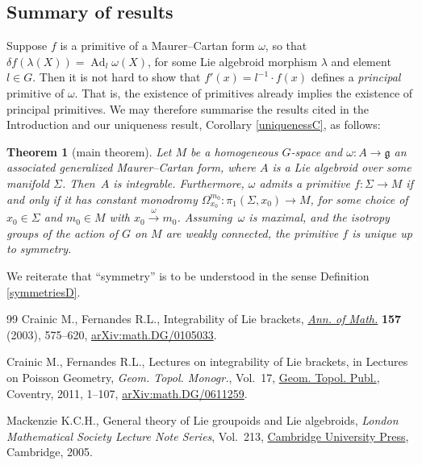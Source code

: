 \documentclass[11pt]{article}
\numberwithin{equation}{section}
\numberwithin{equation}{section}
\newtheorem{Theorem}{Theorem}[section]
\DeclareMathOperator{\Adjoint}{Ad}
\begin{document}
\subsection*{Summary of results}

Suppose $f$ is a primitive of a Maurer--Cartan form $\omega $, so that
$\delta f (\lambda(X))=\Adjoint_l \omega(X)$, for some Lie algebroid
morphism $\lambda $ and element $l \in G$. Then it is not hard to show
that $f'(x)=l^{-1} \cdot f(x)$ defines a {\em principal} primitive of
$\omega $. That is, the existence of primitives already implies the
existence of principal primitives. We may therefore summarise the
results cited in the Introduction and our uniqueness result, Corollary
\ref{uniquenessC}, as follows:

\begin{Theorem}[main theorem]\label{summaryT}
 Let $M$ be a homogeneous $G$-space and
 $\omega \colon A \rightarrow {\mathfrak g} $ an associated
 generalized Maurer--Cartan form, where $A$ is a Lie algebroid over
 some manifold $\Sigma $. Then~$A$ is integrable. Furthermore,
 $\omega $ admits a primitive $f \colon \Sigma \rightarrow M$ if and
 only if it has constant monodromy
 $\Omega_{x_0}^{m_0} \colon \pi_1(\Sigma, x_0) \rightarrow M$, for
 some choice of $x_0 \in \Sigma $ and $m_0 \in M$ with
 $x_0\xrightarrow{\omega}m_0$. Assu\-ming~$\omega $ is maximal, and the isotropy groups of the action of $G$ on $M$ are weakly
 connected, the primitive $f$ is unique up to symmetry.
\end{Theorem}

We reiterate that ``symmetry'' is to be understood in the sense Definition \ref{symmetriesD}.

\begin{thebibliography}{99}
Crainic M., Fernandes R.L., Integrability of {L}ie brackets, \href{https://doi.org/10.4007/annals.2003.157.575}{\textit{Ann. of
 Math.}} \textbf{157} (2003), 575--620, \href{https://arxiv.org/abs/math.DG/0105033}{arXiv:math.DG/0105033}.

Crainic M., Fernandes R.L., Lectures on integrability of {L}ie brackets, in
 Lectures on {P}oisson Geometry, \textit{Geom. Topol. Monogr.}, Vol.~17, \href{https://doi.org/10.2140/gt}{Geom.
 Topol. Publ.}, Coventry, 2011, 1--107, \href{https://arxiv.org/abs/math.DG/0611259}{arXiv:math.DG/0611259}.

Mackenzie K.C.H., General theory of {L}ie groupoids and {L}ie algebroids,
 \textit{London Mathematical Society Lecture Note Series}, Vol.~213, \href{https://doi.org/10.1017/CBO9781107325883}{Cambridge
 University Press}, Cambridge, 2005.

\end{thebibliography}
\end{document}
